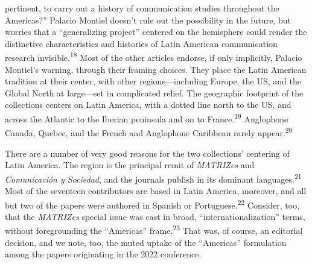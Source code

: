 \documentclass{tufte-handout}
\begin{document}
pertinent, to carry out a history of communication studies throughout
the Americas?'' Palacio Montiel doesn't rule out the possibility in the
future, but worries that a ``generalizing project'' centered on the
hemisphere could render the distinctive characteristics and histories of
Latin American communication research invisible.\textsuperscript{18} Most of the other articles endorse, if only
implicitly, Palacio Montiel's warning, through their framing choices.
They place the Latin American tradition at their center, with other
regions---including Europe, the US, and the Global North at large---set
in complicated relief. The geographic footprint of the collections
centers on Latin America, with a dotted line north to the US, and across
the Atlantic to the Iberian peninsula and on to France.\textsuperscript{19}
Anglophone Canada, Quebec, and the French and Anglophone Caribbean
rarely appear.\textsuperscript{20}

There are a number of very good reasons for the two collections'
centering of Latin America. The region is the principal remit of
\emph{MATRIZes} and \emph{Comunicación y Sociedad}, and the journals
publish in its dominant languages.\textsuperscript{21}
Most of the seventeen contributors are based in Latin America, moreover,
and all but two of the papers were authored in Spanish or
Portuguese.\textsuperscript{22} Consider, too, that the \emph{MATRIZes} special issue was
cast in broad, ``internationalization'' terms, without foregrounding the
``Americas'' frame.\textsuperscript{23} That was, of course, an
editorial decision, and we note, too, the muted uptake of the
``Americas'' formulation among the papers originating in the 2022
conference.
\end{document}
